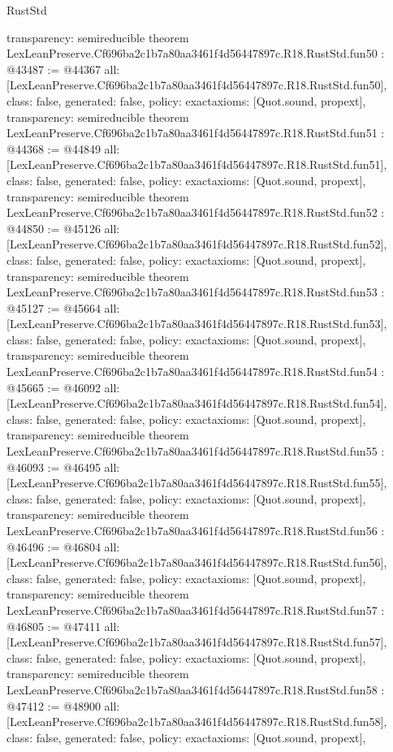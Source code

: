 \begin{lexlean}{RustStd}
\begin{coremodule}
{  transparency: semireducible
}
theorem LexLeanPreserve.Cf696ba2c1b7a80aa3461f4d56447897c.R18.RustStd.fun50 : @43487 := @44367 {
  all: [LexLeanPreserve.Cf696ba2c1b7a80aa3461f4d56447897c.R18.RustStd.fun50],
  class: false,
  generated: false,
  policy: exact{axioms: [Quot.sound, propext]},
  transparency: semireducible
}
theorem LexLeanPreserve.Cf696ba2c1b7a80aa3461f4d56447897c.R18.RustStd.fun51 : @44368 := @44849 {
  all: [LexLeanPreserve.Cf696ba2c1b7a80aa3461f4d56447897c.R18.RustStd.fun51],
  class: false,
  generated: false,
  policy: exact{axioms: [Quot.sound, propext]},
  transparency: semireducible
}
theorem LexLeanPreserve.Cf696ba2c1b7a80aa3461f4d56447897c.R18.RustStd.fun52 : @44850 := @45126 {
  all: [LexLeanPreserve.Cf696ba2c1b7a80aa3461f4d56447897c.R18.RustStd.fun52],
  class: false,
  generated: false,
  policy: exact{axioms: [Quot.sound, propext]},
  transparency: semireducible
}
theorem LexLeanPreserve.Cf696ba2c1b7a80aa3461f4d56447897c.R18.RustStd.fun53 : @45127 := @45664 {
  all: [LexLeanPreserve.Cf696ba2c1b7a80aa3461f4d56447897c.R18.RustStd.fun53],
  class: false,
  generated: false,
  policy: exact{axioms: [Quot.sound, propext]},
  transparency: semireducible
}
theorem LexLeanPreserve.Cf696ba2c1b7a80aa3461f4d56447897c.R18.RustStd.fun54 : @45665 := @46092 {
  all: [LexLeanPreserve.Cf696ba2c1b7a80aa3461f4d56447897c.R18.RustStd.fun54],
  class: false,
  generated: false,
  policy: exact{axioms: [Quot.sound, propext]},
  transparency: semireducible
}
theorem LexLeanPreserve.Cf696ba2c1b7a80aa3461f4d56447897c.R18.RustStd.fun55 : @46093 := @46495 {
  all: [LexLeanPreserve.Cf696ba2c1b7a80aa3461f4d56447897c.R18.RustStd.fun55],
  class: false,
  generated: false,
  policy: exact{axioms: [Quot.sound, propext]},
  transparency: semireducible
}
theorem LexLeanPreserve.Cf696ba2c1b7a80aa3461f4d56447897c.R18.RustStd.fun56 : @46496 := @46804 {
  all: [LexLeanPreserve.Cf696ba2c1b7a80aa3461f4d56447897c.R18.RustStd.fun56],
  class: false,
  generated: false,
  policy: exact{axioms: [Quot.sound, propext]},
  transparency: semireducible
}
theorem LexLeanPreserve.Cf696ba2c1b7a80aa3461f4d56447897c.R18.RustStd.fun57 : @46805 := @47411 {
  all: [LexLeanPreserve.Cf696ba2c1b7a80aa3461f4d56447897c.R18.RustStd.fun57],
  class: false,
  generated: false,
  policy: exact{axioms: [Quot.sound, propext]},
  transparency: semireducible
}
theorem LexLeanPreserve.Cf696ba2c1b7a80aa3461f4d56447897c.R18.RustStd.fun58 : @47412 := @48900 {
  all: [LexLeanPreserve.Cf696ba2c1b7a80aa3461f4d56447897c.R18.RustStd.fun58],
  class: false,
  generated: false,
  policy: exact{axioms: [Quot.sound, propext]},
}
\end{coremodule}
\end{lexlean}
